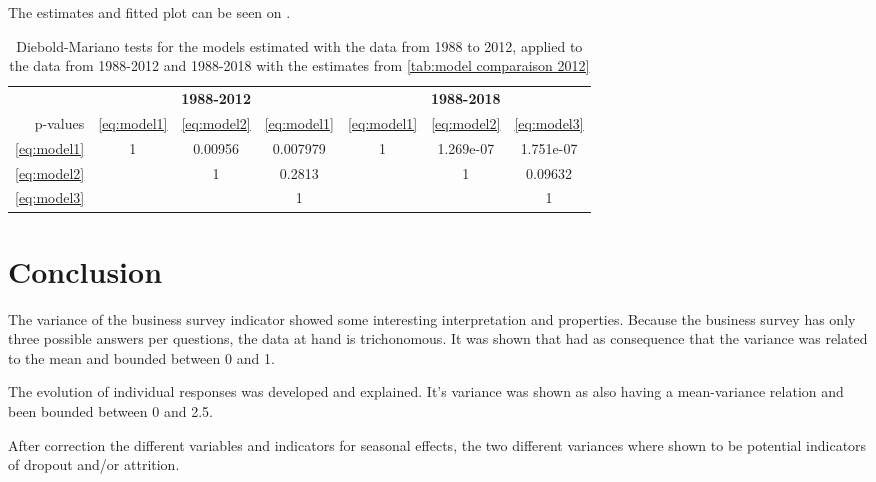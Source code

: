 \documentclass[12pt,a4paper,oneside]{book}
\begin{document}
The estimates and fitted plot can be seen on . 



\begin{table}[htp!]
    \caption{Diebold-Mariano tests for the models estimated with the data from 1988 to 2012, applied to the data from 1988-2012 and 1988-2018 with the estimates from \autoref{tab:model comparaison 2012}}
    \label{tab:Diebold Mariano 3}
     \centering \footnotesize
    \begin{tabular}{| r | c c c | c c c |}
 \multicolumn{1}{r}{} &    \multicolumn{3}{c}{\textbf{1988-2012}} &    \multicolumn{3}{c}{\textbf{1988-2018}} \\ \cline{2-7}
 \multicolumn{0}{r|}{p-values}	& \ref{eq:model1} & \ref{eq:model2} & \ref{eq:model1} & \ref{eq:model1} & \ref{eq:model2} & \ref{eq:model3} \\ \cline{1-7}
 \ref{eq:model1} & 1 & 0.00956 & 0.007979 & 1 & 1.269e-07 & 1.751e-07 \\ 
 \ref{eq:model2} &   & 1  & 0.2813 &   	  & 1 & 0.09632 \\
 \ref{eq:model3} &   &    & 1 &   &   & 1   \\ \cline{1-7}
\end{tabular}
\end{table}















\chapter{Conclusion}


The variance of the business survey indicator showed some interesting interpretation and properties. Because the business survey has only three possible answers per questions, the data at hand is trichonomous. It was shown that had as consequence that the variance was related to the mean and bounded between 0 and 1.

The evolution of individual responses was developed and explained.
It's variance was shown as also having a mean-variance relation and been bounded between 0 and 2.5.

After correction the different variables and indicators for seasonal effects, the two different variances where shown to be potential indicators of dropout and/or attrition.
\end{document}

